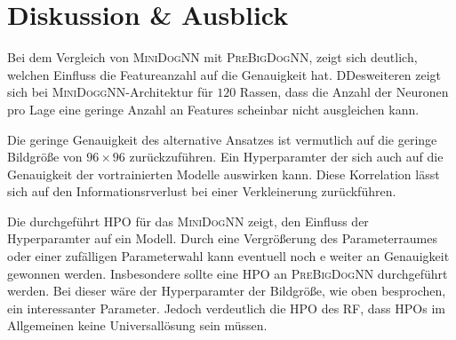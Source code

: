\section{Diskussion \& Ausblick}
Bei dem Vergleich von \textsc{MiniDogNN} mit \textsc{PreBigDogNN},
zeigt sich deutlich, welchen Einfluss die Featureanzahl auf die Genauigkeit hat.
DDesweiteren zeigt sich bei \textsc{MiniDoggNN}-Architektur
für $120$ Rassen, dass die Anzahl der Neuronen pro Lage eine geringe Anzahl an
Features scheinbar nicht ausgleichen kann.

Die geringe Genauigkeit des alternative Ansatzes ist vermutlich auf die
geringe Bildgröße von $96\times96$ zurückzuführen.
Ein Hyperparamter der sich auch auf die Genauigkeit der vortrainierten Modelle
auswirken kann. Diese Korrelation lässt sich auf den Informationsrverlust bei
einer Verkleinerung zurückführen.

Die durchgeführt HPO für das \textsc{MiniDogNN} zeigt, den Einfluss der
Hyperparamter auf ein Modell. Durch eine Vergrößerung
des Parameterraumes oder einer zufälligen Parameterwahl kann eventuell noch e
weiter an Genauigkeit gewonnen werden. Insbesondere sollte eine HPO an
\textsc{PreBigDogNN} durchgeführt werden. Bei dieser wäre der Hyperparamter
der Bildgröße, wie oben besprochen, ein interessanter Parameter. Jedoch verdeutlich
die HPO des RF, dass HPOs im Allgemeinen keine Universallösung sein müssen.

